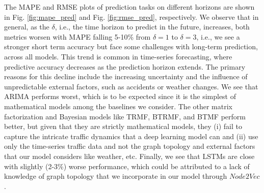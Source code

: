 The MAPE and RMSE plots of prediction tasks on different horizons are shown in Fig. \ref{fig:mape_pred} and Fig. \ref{fig:rmse_pred}, respectively. We observe that in general, as the $\delta$, i.e., the time horizon to predict in the future, increases, both metrics worsen with MAPE falling 5-10\% from $\delta=1$ to $\delta=3$, i.e., we see a stronger short term accuracy but face some challenges with long-term prediction, across all models. This trend is common in time-series forecasting, where predictive accuracy decreases as the prediction horizon extends. The primary reasons for this decline include the increasing uncertainty and the influence of unpredictable external factors, such as accidents or weather changes. We see that ARIMA performs worst, which is to be expected since it is the simplest of mathematical models among the baselines we consider. The other matrix factorization and Bayesian models like TRMF, BTRMF, and BTMF perform better, but given that they are strictly mathematical models, they (i) fail to capture the intricate traffic dynamics that a deep learning model can and (ii) use only the time-series traffic data and not the graph topology and external factors that our model considers like weather, etc. Finally, we see that LSTMs are close with slightly (2-3\%) worse performance, which could be attributed to a lack of knowledge of graph topology that we incorporate in our model through $Node2Vec$.

